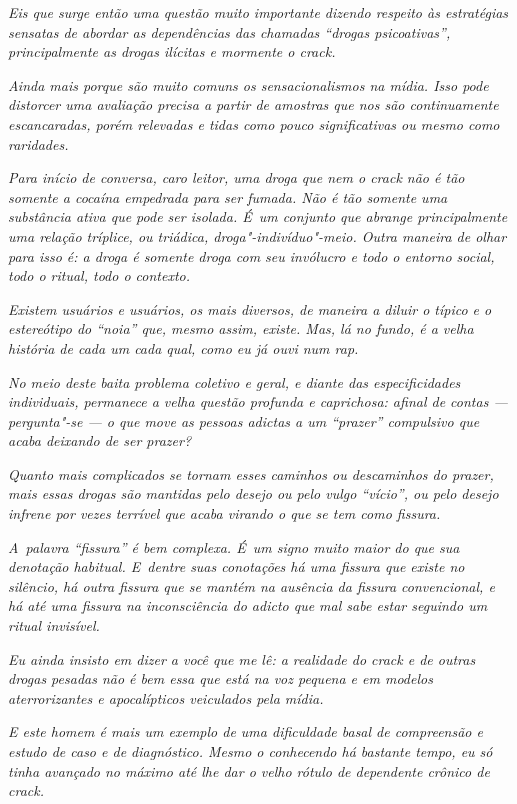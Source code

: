 \emph{Eis que surge então uma questão muito importante dizendo respeito
às estratégias sensatas de abordar as dependências das chamadas ``drogas
psicoativas'', principalmente as drogas ilícitas e mormente o crack.}~

\emph{Ainda mais porque são muito comuns os sensacionalismos na mídia.
Isso pode distorcer uma avaliação precisa a partir de amostras que nos
são continuamente escancaradas, porém relevadas e tidas como pouco
significativas ou mesmo como raridades.}~

\emph{Para início de conversa, caro leitor, uma droga que nem o crack
não é tão somente a cocaína empedrada para ser fumada. Não é tão somente
uma substância ativa que pode ser isolada. É~um conjunto que abrange
principalmente uma relação tríplice, ou triádica, droga"-indivíduo"-meio.
Outra maneira de olhar para isso é: a droga é somente droga com seu
invólucro e todo o entorno social, todo o ritual, todo o contexto.}~

\emph{Existem usuários e usuários, os mais diversos, de maneira a diluir
o típico e o estereótipo do ``noia'' que, mesmo assim, existe. Mas, lá no
fundo, é a velha história de cada um cada qual, como eu já ouvi num
rap.}~

\emph{No meio deste baita problema coletivo e geral, e diante das
especificidades individuais, permanece a velha questão profunda e
caprichosa: afinal de contas --- pergunta"-se --- o que move as pessoas
adictas a um ``prazer'' compulsivo que acaba deixando de ser prazer?}

\emph{Quanto mais complicados se tornam esses caminhos ou descaminhos do
prazer, mais essas drogas são mantidas pelo desejo ou pelo vulgo
``vício'', ou pelo desejo infrene por vezes terrível que acaba virando o
que se tem como fissura.}

\emph{A~palavra ``fissura'' é bem complexa. É~um signo muito maior do que
sua denotação habitual. E~dentre suas conotações há uma fissura que
existe no silêncio, há outra fissura que se mantém na ausência da
fissura convencional, e há até uma fissura na inconsciência do adicto
que mal sabe estar seguindo um ritual invisível.}~

\emph{Eu ainda insisto em dizer a você que me lê: a realidade do crack e
de outras drogas pesadas não é bem essa que está na voz pequena e em
modelos aterrorizantes e apocalípticos veiculados pela mídia.}~

\emph{E este homem é mais um exemplo de uma dificuldade basal de
compreensão e estudo de caso e de diagnóstico. Mesmo o conhecendo há
bastante tempo, eu só tinha avançado no máximo até lhe dar o velho
rótulo de dependente crônico de crack.}~

